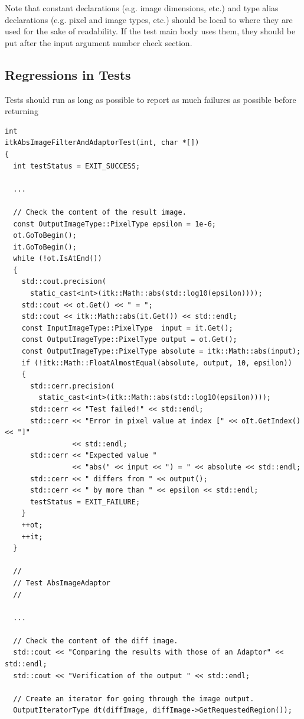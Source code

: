 Note that constant declarations (e.g. image dimensions, etc.) and
type alias declarations (e.g. pixel and image types, etc.) should be local
to where they are used for the sake of readability. If the test main body uses
them, they should be put after the input argument number check section.


\subsection{Regressions in Tests}%
\label{subsec:RegressionsInTests}

Tests should run as long as possible to report as much failures as possible before returning

\small
\begin{verbatim}
int
itkAbsImageFilterAndAdaptorTest(int, char *[])
{
  int testStatus = EXIT_SUCCESS;

  ...

  // Check the content of the result image.
  const OutputImageType::PixelType epsilon = 1e-6;
  ot.GoToBegin();
  it.GoToBegin();
  while (!ot.IsAtEnd())
  {
    std::cout.precision(
      static_cast<int>(itk::Math::abs(std::log10(epsilon))));
    std::cout << ot.Get() << " = ";
    std::cout << itk::Math::abs(it.Get()) << std::endl;
    const InputImageType::PixelType  input = it.Get();
    const OutputImageType::PixelType output = ot.Get();
    const OutputImageType::PixelType absolute = itk::Math::abs(input);
    if (!itk::Math::FloatAlmostEqual(absolute, output, 10, epsilon))
    {
      std::cerr.precision(
        static_cast<int>(itk::Math::abs(std::log10(epsilon))));
      std::cerr << "Test failed!" << std::endl;
      std::cerr << "Error in pixel value at index [" << oIt.GetIndex() << "]"
                << std::endl;
      std::cerr << "Expected value "
                << "abs(" << input << ") = " << absolute << std::endl;
      std::cerr << " differs from " << output();
      std::cerr << " by more than " << epsilon << std::endl;
      testStatus = EXIT_FAILURE;
    }
    ++ot;
    ++it;
  }

  //
  // Test AbsImageAdaptor
  //

  ...

  // Check the content of the diff image.
  std::cout << "Comparing the results with those of an Adaptor" << std::endl;
  std::cout << "Verification of the output " << std::endl;

  // Create an iterator for going through the image output.
  OutputIteratorType dt(diffImage, diffImage->GetRequestedRegion());


\end{verbatim}
